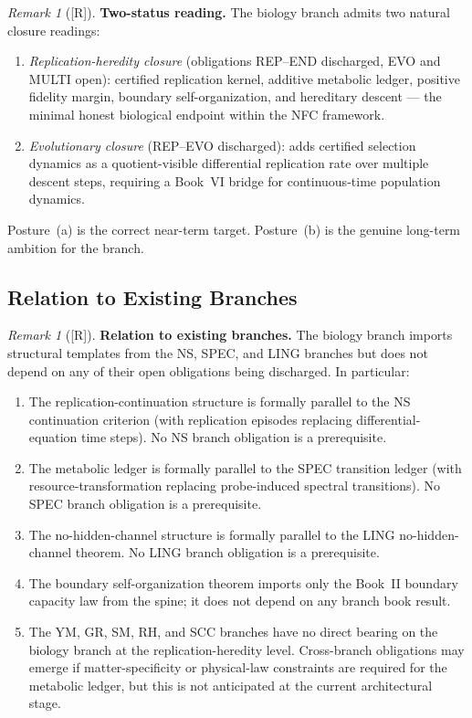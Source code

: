 \documentclass[12pt,oneside]{amsbook}
\theoremstyle{plain}
\theoremstyle{definition}
\theoremstyle{remark}
\newtheorem{remark}[theorem]{Remark}
\newcommand{\status}[1]{\textup{[#1]}}
\begin{document}
\begin{remark}[\status{R}]\label{rem:bio-two-status}
\textbf{Two-status reading.}
The biology branch admits two natural closure readings:
\begin{enumerate}[label=\textup{(\alph*)}]
 \item \emph{Replication-heredity closure} (obligations REP--END
 discharged, EVO and MULTI open): certified replication kernel,
 additive metabolic ledger, positive fidelity margin, boundary
 self-organization, and hereditary descent --- the minimal honest
 biological endpoint within the NFC framework.
 \item \emph{Evolutionary closure} (REP--EVO discharged): adds
 certified selection dynamics as a quotient-visible differential
 replication rate over multiple descent steps, requiring a Book~VI
 bridge for continuous-time population dynamics.
\end{enumerate}
Posture~(a) is the correct near-term target. Posture~(b) is the
genuine long-term ambition for the branch.
\end{remark}

\subsection{Relation to Existing Branches}

\begin{remark}[\status{R}]\label{rem:bio-branch-relations}
\textbf{Relation to existing branches.}
The biology branch imports structural templates from the NS, SPEC, and
LING branches but does not depend on any of their open obligations
being discharged. In particular:
\begin{enumerate}[label=\textup{(\arabic*)}]
 \item The replication-continuation structure is formally parallel to
 the NS continuation criterion (with replication episodes replacing
 differential-equation time steps). No NS branch obligation is a
 prerequisite.
 \item The metabolic ledger is formally parallel to the SPEC
 transition ledger (with resource-transformation replacing
 probe-induced spectral transitions). No SPEC branch obligation
 is a prerequisite.
 \item The no-hidden-channel structure is formally parallel to the
 LING no-hidden-channel theorem. No LING branch obligation is a
 prerequisite.
 \item The boundary self-organization theorem imports only the
 Book~II boundary capacity law from the spine; it does not depend
 on any branch book result.
 \item The YM, GR, SM, RH, and SCC branches have no direct bearing
 on the biology branch at the replication-heredity level. Cross-branch
 obligations may emerge if matter-specificity or physical-law
 constraints are required for the metabolic ledger, but this is not
 anticipated at the current architectural stage.
\end{enumerate}
\end{remark}
\end{document}
